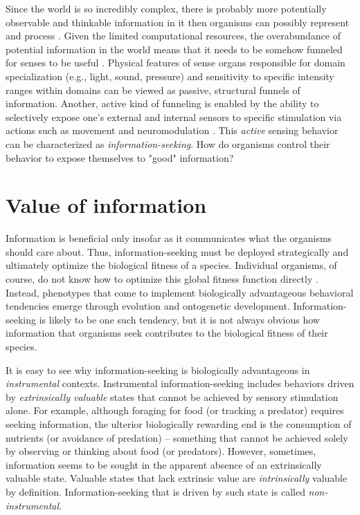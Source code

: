 Since the world is so incredibly complex, there is probably more potentially observable and thinkable information in it then organisms can possibly represent and process \cite{kolmogorov1965three}. Given the limited computational resources, the overabundance of potential information in the world means that it needs to be somehow funneled for senses to be useful \cite{gottlieb_towards_2018}. Physical features of sense organs responsible for domain specialization (e.g., light, sound, pressure) and sensitivity to specific intensity ranges within domains \cite[e.g.,][]{schwab_evolution_2018} can be viewed as passive, structural funnels of information. Another, active kind of funneling is enabled by the ability to selectively expose one's external and internal sensors to specific stimulation via actions such as movement \cite[e.g. ][]{gottlieb_information-seeking_2013} and neuromodulation \cite[e.g.,][]{yu_uncertainty_2005}. This \emph{active} sensing behavior can be characterized as \emph{information-seeking}. How do organisms control their behavior to expose themselves to "good" information?

\section{Value of information}

Information is beneficial only insofar as it communicates what the organisms should care about. Thus, information-seeking must be deployed strategically and ultimately optimize the biological fitness of a species. Individual organisms, of course, do not know how to optimize this global fitness function directly \cite{ten_berge_procedural_1999,singh_intrinsically_2010,gottlieb_information-seeking_2013}. Instead, phenotypes that come to implement biologically advantageous behavioral tendencies emerge through evolution and ontogenetic development. Information-seeking is likely to be one such tendency, but it is not always obvious how information that organisms seek contributes to the biological fitness of their species.

It is easy to see why information-seeking is biologically advantageous in \emph{instrumental} contexts. Instrumental information-seeking includes behaviors driven by \emph{extrinsically valuable} states that cannot be achieved by sensory stimulation alone. For example, although foraging for food (or tracking a predator) requires seeking information, the ulterior biologically rewarding end is the consumption of nutrients (or avoidance of predation) -- something that cannot be achieved solely by observing or thinking about food (or predators). However, sometimes, information seems to be sought in the apparent absence of an extrinsically valuable state. Valuable states that lack extrinsic value are \emph{intrinsically} valuable by definition. Information-seeking that is driven by such state is called \emph{non-instrumental}.

